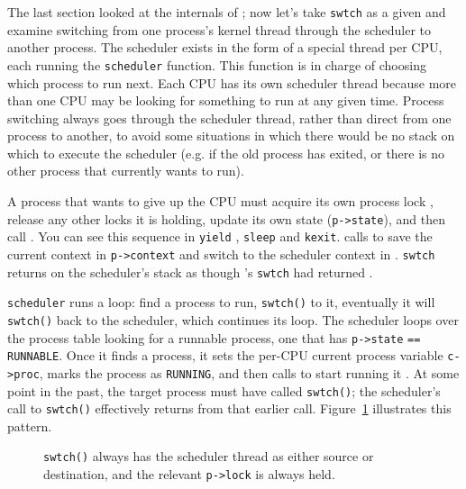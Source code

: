 
The last section looked at the internals of
;
now let's take 
\lstinline{swtch}
as a given and examine 
switching from one process's kernel thread
through the scheduler to another process.
The scheduler exists in the form of a special thread per CPU, each running the
\lstinline{scheduler}
function.
This function is in charge of choosing which process to run next.
Each CPU has its own scheduler thread because more than one CPU may be
looking for something to run at any given time. Process switching
always goes through the scheduler thread, rather than direct from one
process to another, to avoid some situations in which there would be
no stack on which to execute the scheduler (e.g. if the old process
has exited, or there is no other process that currently wants to run).

A process
that wants to give up the CPU must
acquire its own process lock
,
release any other locks it is holding,
update its own state
(\lstinline{p->state}),
and then call
.
You can see this sequence in
\lstinline{yield}
,
\texttt{sleep}
and
\texttt{kexit}.
calls
to save the current context in 
\lstinline{p->context}
and switch to the scheduler context in
.
\lstinline{swtch}
returns on the scheduler's stack
as though
's
\lstinline{swtch}
had returned
.

\lstinline{scheduler}
runs a loop:
find a process to run, {\tt swtch()} to it, eventually it
will {\tt swtch()} back to the scheduler, which continues its loop.
The scheduler
loops over the process table
looking for a runnable process, one that has
\lstinline{p->state} 
\lstinline{==}
\lstinline{RUNNABLE}.
Once it finds a process, it sets the per-CPU current process
variable
\lstinline{c->proc},
marks the process as
\lstinline{RUNNING},
and then calls
to start running it
.
At some point in the past, the target process must
have called {\tt swtch()}; the scheduler's call to
{\tt swtch()} effectively returns from that
earlier call.
Figure~\ref{fig:inout} illustrates this pattern.

\begin{figure}[t]

\caption{{\tt swtch()} always has the scheduler thread as either source
or destination, and the relevant {\tt p->lock} is always held.}
\label{fig:inout}
\end{figure}

